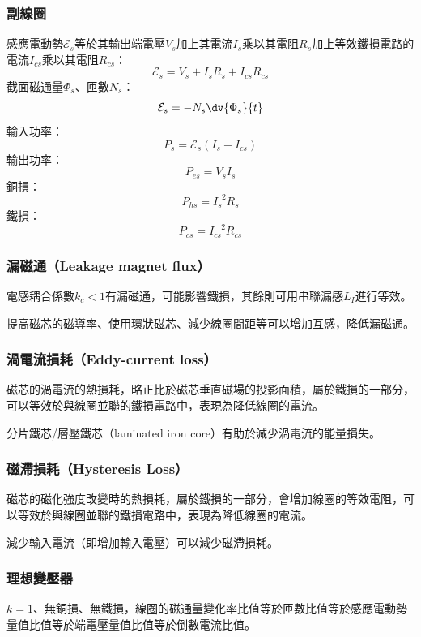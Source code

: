 \documentclass[a4paper,12pt]{report}
\begin{document}
\begin{itemize}
\subsubsection{副線圈}
感應電動勢$\mathcal{E}_s$等於其輸出端電壓$V_s$加上其電流$I_s$乘以其電阻$R_s$加上等效鐵損電路的電流$I_{cs}$乘以其電阻$R_{cs}$：
\[\mathcal{E}_s=V_s+I_sR_s+I_{cs}R_{cs}\]
截面磁通量$\Phi_s$、匝數$N_s$：
\[\mathcal{E}_s=-N_s\dv{\Phi_s}{t}\]
輸入功率：
\[P_s=\mathcal{E}_s(I_s+I_{cs})\]
輸出功率：
\[P_{es}=V_sI_s\]
銅損：
\[P_{hs}=I_s^{\phantom{s}2}R_s\]
鐵損：
\[P_{cs}=I_{cs}^{\phantom{cs}2}R_{cs}\]
\subsubsection{漏磁通（Leakage magnet flux）}
電感耦合係數$k_c<1$有漏磁通，可能影響鐵損，其餘則可用串聯漏感$L_I$進行等效。

提高磁芯的磁導率、使用環狀磁芯、減少線圈間距等可以增加互感，降低漏磁通。
\subsubsection{渦電流損耗（Eddy-current loss）}
磁芯的渦電流的熱損耗，略正比於磁芯垂直磁場的投影面積，屬於鐵損的一部分，可以等效於與線圈並聯的鐵損電路中，表現為降低線圈的電流。

分片鐵芯/層壓鐵芯（laminated iron core）有助於減少渦電流的能量損失。
\subsubsection{磁滯損耗（Hysteresis Loss）}
磁芯的磁化強度改變時的熱損耗，屬於鐵損的一部分，會增加線圈的等效電阻，可以等效於與線圈並聯的鐵損電路中，表現為降低線圈的電流。

減少輸入電流（即增加輸入電壓）可以減少磁滯損耗。
\subsubsection{理想變壓器}
$k=1$、無銅損、無鐵損，線圈的磁通量變化率比值等於匝數比值等於感應電動勢量值比值等於端電壓量值比值等於倒數電流比值。


\end{itemize}
\end{document}
